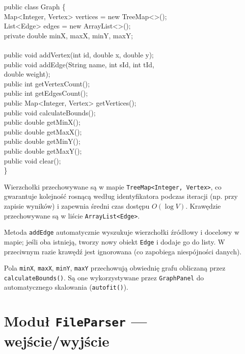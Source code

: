 \documentclass[a4paper, 11pt]{article}
\begin{document}
\begin{filebox}
public class Graph \{\\
\quad Map<Integer, Vertex> vertices = new TreeMap<>();\\
\quad List<Edge> edges = new ArrayList<>();\\
\quad private double minX, maxX, minY, maxY;\\
\\
\quad public void addVertex(int id, double x, double y);\\
\quad public void addEdge(String name, int sId, int tId,\\
\quad \qquad\qquad\qquad\quad\;\; double weight);\\
\quad public int getVertexCount();\\
\quad public int getEdgesCount();\\
\quad public Map<Integer, Vertex> getVertices();\\
\quad public void calculateBounds();\\
\quad public double getMinX();\\
\quad public double getMaxX();\\
\quad public double getMinY();\\
\quad public double getMaxY();\\
\quad public void clear();\\
\}
\end{filebox}

Wierzchołki przechowywane są w mapie \texttt{TreeMap<Integer, Vertex>},
co gwarantuje kolejność rosnącą według identyfikatora podczas iteracji
(np. przy zapisie wyników) i zapewnia średni czas dostępu $O(\log V)$.
Krawędzie przechowywane są w liście \texttt{ArrayList<Edge>}.

Metoda \texttt{addEdge} automatycznie wyszukuje wierzchołki źródłowy
i docelowy w mapie; jeśli oba istnieją, tworzy nowy obiekt \texttt{Edge}
i dodaje go do listy. W przeciwnym razie krawędź jest ignorowana
(co zapobiega niespójności danych).

Pola \texttt{minX}, \texttt{maxX}, \texttt{minY}, \texttt{maxY}
przechowują obwiednię grafu obliczaną przez \texttt{calculateBounds()}.
Są one wykorzystywane przez \texttt{GraphPanel} do automatycznego
skalowania (\texttt{autofit()}).

\section{Moduł \texttt{FileParser} --- wejście/wyjście}
\end{document}
